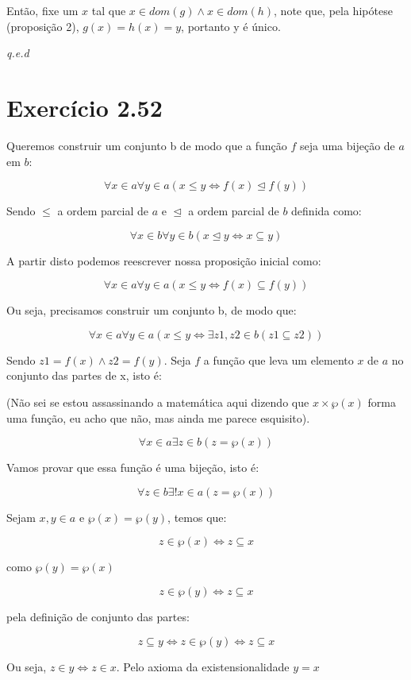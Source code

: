 \documentclass[12pt]{extarticle}
\newcommand{\fim}{\begin{flushright}

   \emph{q.e.d}
\end{flushright}}
\begin{document}
Então, fixe um $x$ tal que $x \in dom(g) \land x \in dom(h)$, note que, pela hipótese (proposição 2), $g(x) = h(x) = y$, portanto y é único.

\fim

\section{Exercício 2.52}

Queremos construir um conjunto b de modo que a função $f$ seja uma bijeção de $a$ em $b$:

$$
\forall x \in a \forall y \in a (x \leq y \Leftrightarrow f(x) \trianglelefteq f(y))
$$

Sendo $\leq$ a ordem parcial de $a$ e $\trianglelefteq$ a ordem parcial de $b$ definida como:

$$
\forall x \in b \forall y \in b (x \trianglelefteq y \Leftrightarrow x \subseteq y)
$$

A partir disto podemos reescrever nossa proposição inicial como:

$$
\forall x \in a \forall y \in a (x \leq y \Leftrightarrow f(x) \subseteq f(y))
$$

Ou seja, precisamos construir um conjunto b, de modo que:

$$
\forall x \in a \forall y \in a (x \leq y \Leftrightarrow \exists z1, z2 \in b (z1 \subseteq z2))
$$

Sendo $z1 = f(x) \land z2 = f(y)$. Seja $f$ a função que leva um elemento $x$ de $a$ no conjunto das partes de x, isto é:

(Não sei se estou assassinando a matemática aqui dizendo que $x \times \wp (x)$ forma uma função, eu acho que não, mas ainda me parece esquisito).

$$
\forall x \in a \exists z \in b (z = \wp (x))
$$

Vamos provar que essa função é uma bijeção, isto é:

$$
\forall z \in b \exists ! x \in a (z = \wp (x))
$$

Sejam $x,y \in a$ e $\wp (x) = \wp (y)$, temos que:

$$
z \in \wp (x) \Leftrightarrow z \subseteq x 
$$

como $\wp(y) = \wp(x)$

$$
z \in \wp (y) \Leftrightarrow z \subseteq x
$$

pela definição de conjunto das partes:

$$
 z \subseteq y \Leftrightarrow z \in \wp (y) \Leftrightarrow z \subseteq x 
$$

Ou seja, $z \in y \Leftrightarrow z \in x$. Pelo axioma da existensionalidade $y = x$
\end{document}
